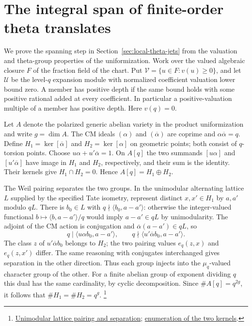 \section{The integral span of finite-order theta translates}
\label{sec:theta-translate-span}

We prove the spanning step in Section~\ref{sec:local-theta-jets}
from the valuation and theta-group properties of the uniformization.
Work over the valued algebraic closure \(F\) of the fraction field
of the chart. Put \(\mathcal V=\{u\in F:v(u)\ge0\}\), and let
\(\mathcal U\) be the level-\(q\) expansion module with normalized
coefficient valuation lower bound zero. A member has positive depth
if the same bound holds with some positive rational added at every
coefficient. In particular a positive-valuation multiple of a
member has positive depth. Here \(v(q)=0\).

Let \(A\) denote the polarized generic abelian variety in the product
uniformization and write \(g=\dim A\).
The CM ideals \((\alpha)\) and \((\overline\alpha)\) are coprime
and \(\alpha\overline\alpha=q\). Define
\(H_1=\ker[\overline\alpha]\) and \(H_2=\ker[\alpha]\) on geometric
points; both consist of \(q\)-torsion points. Choose
\(u\alpha+u'\overline\alpha=1\). On \(A[q]\) the two summands
\([u\alpha]\) and \([u'\overline\alpha]\) have image in \(H_1\)
and \(H_2\), respectively, and their sum is the identity.
Their kernels give \(H_1\cap H_2=0\). Hence
\(A[q]=H_1\oplus H_2\).

The Weil pairing separates the two groups. In the unimodular
alternating lattice \(L\) supplied by the specified Tate isometry,
represent distinct \(x,x'\in H_1\) by \(a,a'\) modulo \(qL\).
There is \(b_0\in L\) with \(q\nmid\langle b_0,a-a'\rangle\):
otherwise the integer-valued functional
\(b\mapsto\langle b,a-a'\rangle/q\) would imply
\(a-a'\in qL\) by unimodularity. The adjoint of the CM action is
conjugation and \(\overline\alpha(a-a')\in qL\), so
\[
   q\mid\langle u\alpha b_0,a-a'\rangle,\qquad
   q\nmid\langle u'\overline\alpha b_0,a-a'\rangle.
\]
The class \(z\) of \(u'\overline\alpha b_0\) belongs to \(H_2\);
the two pairing values \(e_q(z,x)\) and \(e_q(z,x')\) differ.
The same reasoning with conjugates interchanged gives separation
in the other direction. Thus each group injects into the
\(\mu_q\)-valued character group of the other. For a finite abelian
group of exponent dividing \(q\) this dual has the same cardinality,
by cyclic decomposition. Since \(\#A[q]=q^{2g}\), it follows that
\(\#H_1=\#H_2=q^g\).
\footnote{\href{https://github.com/ChristianKudeba/alpoge-rh-verification/blob/alpoge-source-7cbf7a0c/src/ReciprocityTheory/ReductiveGroups/ArithmeticGeometry/FirstCohomology/AlphaPair.lean}{Unimodular lattice pairing and separation};
\href{https://github.com/ChristianKudeba/alpoge-rh-verification/blob/alpoge-source-7cbf7a0c/src/ReciprocityTheory/ReductiveGroups/ArithmeticGeometry/FirstCohomology/AlphaBarEnum.lean}{enumeration of the two kernels}.}

